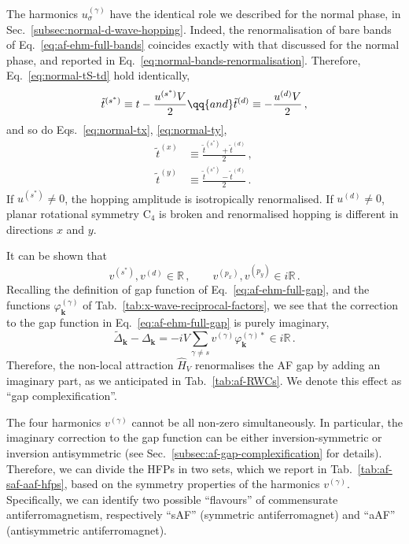 The harmonics $u_\sigma^{(\gamma)}$ have the identical role we described for the normal phase, in Sec.~\ref{subsec:normal-d-wave-hopping}. Indeed, the renormalisation of bare bands of Eq.~\eqref{eq:af-ehm-full-bands} coincides exactly with that discussed for the normal phase, and reported in Eq.~\eqref{eq:normal-bands-renormalisation}. Therefore, Eq.~\eqref{eq:normal-tS-td} hold identically,
\begin{equation}\label{eq:af-tS-td}
	\tilde{t}^{(s^*)} \equiv t - \frac{u^{(s^*)} V}{2}
	\qq{and}
	\tilde{t}^{(d)} \equiv - \frac{u^{(d)} V}{2} \, ,
\end{equation}
and so do Eqs.~\eqref{eq:normal-tx}, \eqref{eq:normal-ty},
\begin{align}
	\tilde{t}^{(x)} &\equiv \frac{\tilde{t}^{(s^*)} + \tilde{t}^{(d)}}{2} \, , \label{eq:af-tx} \\
	\tilde{t}^{(y)} &\equiv \frac{\tilde{t}^{(s^*)} - \tilde{t}^{(d)}}{2} \, . \label{eq:af-ty}
\end{align}
If $u^{(s^*)} \neq 0$, the hopping amplitude is isotropically renormalised. If $u^{(d)} \neq 0$, planar rotational symmetry $\mathrm{C}_4$ is broken and renormalised hopping is different in directions $x$ and $y$.

It can be shown that
\begin{equation}\label{eq:af-v-Re-iRe}
	v^{(s^*)}, v^{(d)} \in \mathbb{R} \, ,
	\qquad
	v^{(p_x)}, v^{(p_y)} \in i\mathbb{R} \, .
\end{equation}
Recalling the definition of gap function of Eq.~\eqref{eq:af-ehm-full-gap}, and the functions $\varphi_\mathbf{k}^{(\gamma)}$ of Tab.~\ref{tab:x-wave-reciprocal-factors}, we see that the correction to the gap function in Eq.~\eqref{eq:af-ehm-full-gap} is purely imaginary,
\[
	\tilde{\Delta}_\mathbf{k} - \Delta_\mathbf{k} = 
	- iV \sum_{\gamma \neq s} v^{(\gamma)} \varphi_\mathbf{k}^{(\gamma)*} \in i\mathbb{R} \, .
\]
Therefore, the non-local attraction $\hat H_V$ renormalises the AF gap by adding an imaginary part, as we anticipated in Tab.~\ref{tab:af-RWCs}. We denote this effect as ``gap complexification''.

The four harmonics $v^{(\gamma)}$ cannot be all non-zero simultaneously. In particular, the imaginary correction to the gap function can be either inversion-symmetric or inversion antisymmetric (see Sec.~\ref{subsec:af-gap-complexification} for details). Therefore, we can divide the HFPs in two sets, which we report in Tab.~\ref{tab:af-saf-aaf-hfps}, based on the symmetry properties of the harmonics $v^{(\gamma)}$. Specifically, we can identify two possible ``flavours'' of commensurate antiferromagnetism, respectively ``sAF'' (symmetric antiferromagnet) and ``aAF'' (antisymmetric antiferromagnet).

